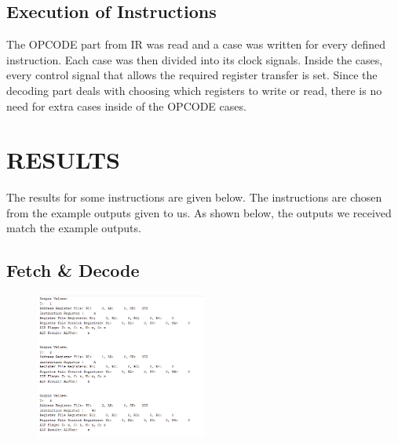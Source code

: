 \documentclass[pdftex,12pt,a4paper]{article}
\begin{document}
\subsection{Execution of Instructions}
The OPCODE part from IR was read and a case was written for every
defined instruction. Each case was then divided into its clock signals.
Inside the cases, every control signal that allows the required
register transfer is set. Since the decoding part deals with choosing
which registers to write or read, there is no need for extra cases
inside of the OPCODE cases.

\section{RESULTS}
The results for some instructions are given below. The instructions
are chosen from the example outputs given to us. As shown below, the
outputs we received match the example outputs.

\subsection{Fetch & Decode}
\begin{figure}[H]
	\centering
	\includegraphics[width=0.5\textwidth]{bra1.png}	
	\label{fig2}
\end{figure}
\end{document}
